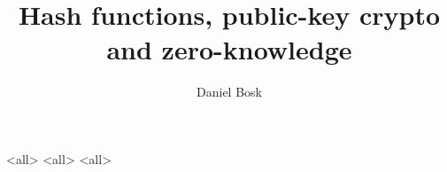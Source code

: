 \title{%
  Hash functions, public-key crypto and zero-knowledge
}
\author{Daniel Bosk}


\mode*

\begin{abstract}
  
\end{abstract}

\begin{frame}
  \tableofcontents
\end{frame}


\mode<all>{}
\mode<all>{}
\mode<all>{}



\begin{frame}[allowframebreaks]
  \printbibliography
\end{frame}
